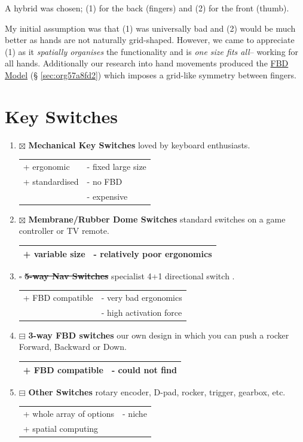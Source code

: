 \documentclass[logo,bsc,singlespacing,parskip]{infthesis}
\begin{document}
A hybrid was chosen; (1) for the back (fingers) and (2) for the front (thumb).

My initial assumption was that (1) was universally bad and (2) would be much better as hands are not naturally grid-shaped.
However, we came to appreciate (1) as it \emph{spatially organises} the functionality and is \emph{one size fits all}-- working for all hands.
Additionally our research into hand movements produced the \hyperref[sec:org57a8fd2]{FBD Model} (§ \ref{sec:org57a8fd2}) which imposes a grid-like symmetry between fingers.
\section{Key Switches}
\label{sec:orgba1a122}
\begin{enumerate}
\item{$\boxtimes$} \textbf{Mechanical Key Switches} loved by keyboard enthusiasts.
\begin{longtable}{|p{6.25cm}|p{6.25cm}|}
\hline
+ ergonomic & - fixed large size\\
+ standardised & - no FBD\\
 & - expensive\\
\hline
\end{longtable}
\item{$\boxtimes$} \textbf{Membrane/Rubber Dome Switches} standard switches on a game controller or TV remote.
\begin{longtable}{|p{6.25cm}|p{6.25cm}|}
\hline
+ variable size & - relatively poor ergonomics\\
\hline
\end{longtable}
\item{$\square$} \sout{\textbf{5-way Nav Switches}} specialist 4+1 directional switch \autocite{Thruhole5wayNavigation}.
\begin{longtable}{|p{6.25cm}|p{6.25cm}|}
\hline
+ FBD compatible & - very bad ergonomics\\
 & - high activation force\\
\hline
\end{longtable}
\item{$\boxminus$} \textbf{3-way FBD switches} our own design in which you can push a rocker Forward, Backward or Down.
\begin{longtable}{|p{6.25cm}|p{6.25cm}|}
\hline
+ FBD compatible & - could not find\\
\hline
\end{longtable}
\item{$\boxminus$} \textbf{Other Switches} rotary encoder, D-pad, rocker, trigger, gearbox, etc.
\begin{longtable}{|p{6.25cm}|p{6.25cm}|}
\hline
+ whole array of options & - niche\\
+ spatial computing & \\
\hline
\end{longtable}
\end{enumerate}
\end{document}
